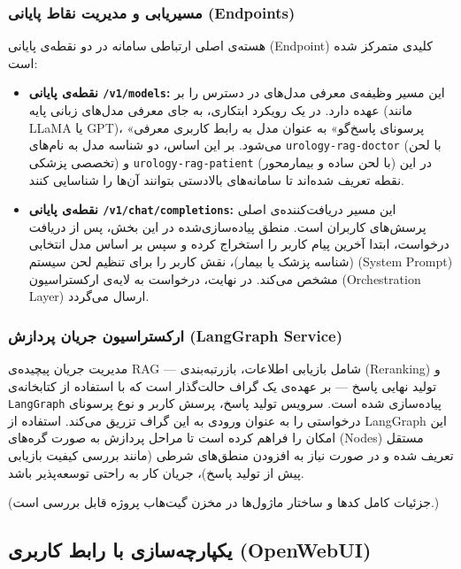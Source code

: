 \subsubsection{مسیریابی و مدیریت نقاط پایانی (Endpoints)}

هسته‌ی اصلی ارتباطی سامانه در دو نقطه‌ی پایانی (Endpoint) کلیدی متمرکز شده است:

\begin{itemize}

\item \textbf{نقطه‌ی پایانی \texttt{/v1/models}:} این مسیر وظیفه‌ی معرفی مدل‌های در دسترس را بر عهده دارد. در یک رویکرد ابتکاری، به جای معرفی مدل‌های زبانی پایه (مانند LLaMA یا GPT)، «پرسونای پاسخ‌گو» به عنوان مدل به رابط کاربری معرفی می‌شود. بر این اساس، دو شناسه مدل به نام‌های \texttt{urology-rag-doctor} (با لحن تخصصی پزشکی) و \texttt{urology-rag-patient} (با لحن ساده و بیمارمحور) در این نقطه تعریف شده‌اند تا سامانه‌های بالادستی بتوانند آن‌ها را شناسایی کنند.

\item \textbf{نقطه‌ی پایانی \texttt{/v1/chat/completions}:} این مسیر دریافت‌کننده‌ی اصلی پرسش‌های کاربران است. منطق پیاده‌سازی‌شده در این بخش، پس از دریافت درخواست، ابتدا آخرین پیام کاربر را استخراج کرده و سپس بر اساس مدل انتخابی (شناسه پزشک یا بیمار)، نقش کاربر را برای تنظیم لحن سیستم (System Prompt) مشخص می‌کند. در نهایت، درخواست به لایه‌ی ارکستراسیون (Orchestration Layer) ارسال می‌گردد.

\end{itemize}

\subsubsection{ارکستراسیون جریان پردازش (LangGraph Service)}

مدیریت جریان پیچیده‌ی RAG — شامل بازیابی اطلاعات، بازرتبه‌بندی (Reranking) و تولید نهایی پاسخ — بر عهده‌ی یک گراف حالت‌گذار است که با استفاده از کتابخانه‌ی \texttt{LangGraph} پیاده‌سازی شده است. سرویس تولید پاسخ، پرسش کاربر و نوع پرسونای درخواستی را به عنوان ورودی به این گراف تزریق می‌کند. استفاده از LangGraph این امکان را فراهم کرده است تا مراحل پردازش به صورت گره‌های (Nodes) مستقل تعریف شده و در صورت نیاز به افزودن منطق‌های شرطی (مانند بررسی کیفیت بازیابی پیش از تولید پاسخ)، جریان کار به راحتی توسعه‌پذیر باشد.

(جزئیات کامل کدها و ساختار ماژول‌ها در مخزن گیت‌هاب پروژه قابل بررسی است.)

\subsection{یکپارچه‌سازی با رابط کاربری (OpenWebUI)}

